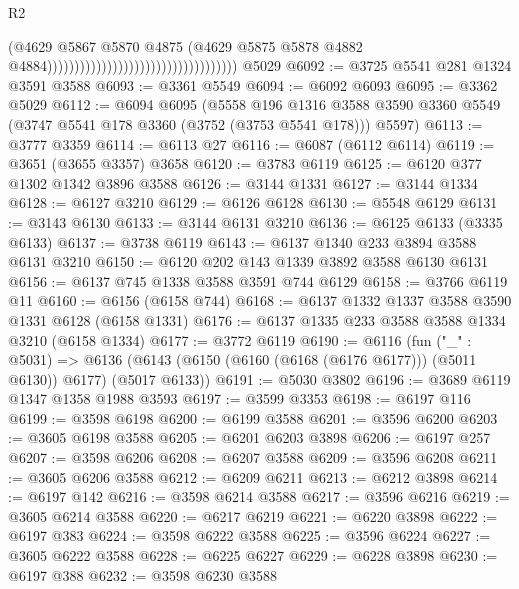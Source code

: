 \begin{lexlean}{R2}
\begin{coremodule}
                                                                      (@4629
                                                                        @5867
                                                                        @5870
                                                                        @4875
                                                                        (@4629
                                                                          @5875
                                                                          @5878
                                                                          @4882
                                                                          @4884)))))))))))))))))))))))))))))))))))
    @5029
@6092 := @3725 @5541 @281 @1324 @3591 @3588
@6093 := @3361 @5549
@6094 := @6092 @6093
@6095 := @3362 @5029
@6112 := @6094
    @6095
    (@5558
      @196
      @1316
      @3588
      @3590
      @3360
      @5549
      (@3747 @5541 @178 @3360 (@3752 (@3753 @5541 @178)))
      @5597)
@6113 := @3777 @3359
@6114 := @6113 @27
@6116 := @6087 (@6112 @6114)
@6119 := @3651 (@3655 @3357) @3658
@6120 := @3783 @6119
@6125 := @6120 @377 @1302 @1342 @3896 @3588
@6126 := @3144 @1331
@6127 := @3144 @1334
@6128 := @6127 @3210
@6129 := @6126 @6128
@6130 := @5548 @6129
@6131 := @3143 @6130
@6133 := @3144 @6131 @3210
@6136 := @6125 @6133 (@3335 @6133)
@6137 := @3738 @6119
@6143 := @6137 @1340 @233 @3894 @3588 @6131 @3210
@6150 := @6120 @202 @143 @1339 @3892 @3588 @6130 @6131
@6156 := @6137 @745 @1338 @3588 @3591 @744 @6129
@6158 := @3766 @6119 @11
@6160 := @6156 (@6158 @744)
@6168 := @6137 @1332 @1337 @3588 @3590 @1331 @6128 (@6158 @1331)
@6176 := @6137 @1335 @233 @3588 @3588 @1334 @3210 (@6158 @1334)
@6177 := @3772 @6119
@6190 := @6116
    (fun ("_" : @5031) =>
    @6136 (@6143 (@6150 (@6160 (@6168 (@6176 @6177))) (@5011 @6130)) @6177) (@5017 @6133))
@6191 := @5030 @3802
@6196 := @3689 @6119 @1347 @1358 @1988 @3593
@6197 := @3599 @3353
@6198 := @6197 @116
@6199 := @3598 @6198
@6200 := @6199 @3588
@6201 := @3596 @6200
@6203 := @3605 @6198 @3588
@6205 := @6201 @6203 @3898
@6206 := @6197 @257
@6207 := @3598 @6206
@6208 := @6207 @3588
@6209 := @3596 @6208
@6211 := @3605 @6206 @3588
@6212 := @6209 @6211
@6213 := @6212 @3898
@6214 := @6197 @142
@6216 := @3598 @6214 @3588
@6217 := @3596 @6216
@6219 := @3605 @6214 @3588
@6220 := @6217 @6219
@6221 := @6220 @3898
@6222 := @6197 @383
@6224 := @3598 @6222 @3588
@6225 := @3596 @6224
@6227 := @3605 @6222 @3588
@6228 := @6225 @6227
@6229 := @6228 @3898
@6230 := @6197 @388
@6232 := @3598 @6230 @3588

\end{coremodule}
\end{lexlean}

